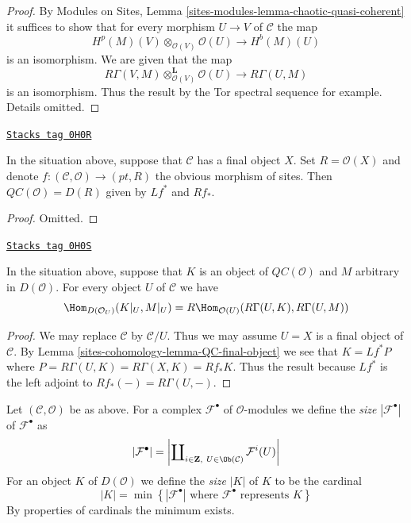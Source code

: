 \begin{proof}
By Modules on Sites, Lemma \ref{sites-modules-lemma-chaotic-quasi-coherent}
it suffices to show that for every morphism $U \to V$ of
$\mathcal{C}$ the map
$$
H^p(M)(V) \otimes_{\mathcal{O}(V)} \mathcal{O}(U) \to H^b(M)(U)
$$
is an isomorphism. We are given that the map
$$
R\Gamma(V, M) \otimes_{\mathcal{O}(V)}^\mathbf{L} \mathcal{O}(U)
\to R\Gamma(U, M)
$$
is an isomorphism. Thus the result by the Tor spectral sequence for example.
Details omitted.
\end{proof}

\begin{lemma}
\label{sites-cohomology-lemma-QC-final-object}
\href{https://stacks.math.columbia.edu/tag/0H0R}{\texttt{Stacks tag 0H0R}}

In the situation above, suppose that $\mathcal{C}$ has a final object $X$.
Set $R = \mathcal{O}(X)$ and denote
$f : (\mathcal{C}, \mathcal{O}) \to (pt, R)$ the obvious morphism of sites.
Then $\mathit{QC}(\mathcal{O}) = D(R)$ given by $Lf^*$ and $Rf_*$.
\end{lemma}

\begin{proof}
Omitted.
\end{proof}

\begin{lemma}
\label{sites-cohomology-lemma-QC-hom-out-of}
\href{https://stacks.math.columbia.edu/tag/0H0S}{\texttt{Stacks tag 0H0S}}

In the situation above, suppose that $K$ is an object of
$\mathit{QC}(\mathcal{O})$ and $M$ arbitrary in $D(\mathcal{O})$.
For every object $U$ of $\mathcal{C}$ we have
$$
\Hom_{D(\mathcal{O}_U)}(K|_U, M|_U) =
R\Hom_{\mathcal{O}(U)}(R\Gamma(U, K), R\Gamma(U, M))
$$
\end{lemma}

\begin{proof}
We may replace $\mathcal{C}$ by $\mathcal{C}/U$. Thus we may assume
$U = X$ is a final object of $\mathcal{C}$. By
Lemma \ref{sites-cohomology-lemma-QC-final-object} we see that $K = Lf^*P$
where $P = R\Gamma(U, K) = R\Gamma(X, K) = Rf_*K$.
Thus the result because $Lf^*$
is the left adjoint to $Rf_*(-) = R\Gamma(U, -)$.
\end{proof}

Let $(\mathcal{C}, \mathcal{O})$ be as above. For a complex
$\mathcal{F}^\bullet$ of $\mathcal{O}$-modules we define the
{\it size} $|\mathcal{F}^\bullet|$ of $\mathcal{F}^\bullet$ as
$$
|\mathcal{F}^\bullet| =
\left|
\coprod\nolimits_{i \in \mathbf{Z},\ U \in \Ob(\mathcal{C})} \mathcal{F}^i(U)
\right|
$$
For an object $K$ of
$D(\mathcal{O})$ we define the {\it size} $|K|$ of $K$ to be the
cardinal
$$
|K| = \min
\left\{
\left|
\mathcal{F}^\bullet
\right|
\text{ where }\mathcal{F}^\bullet\text{ represents }K
\right\}
$$
By properties of cardinals the minimum exists.

